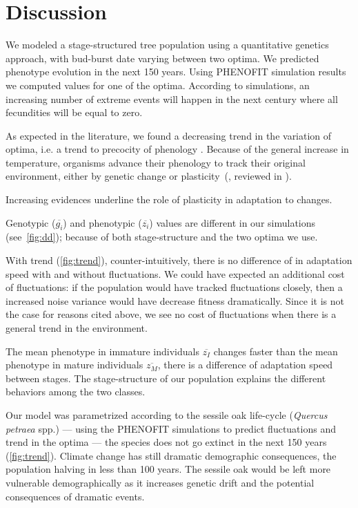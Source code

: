 \label{sec:Disc}
\section*{Discussion}

We modeled a stage-structured tree population using a quantitative genetics approach, with bud-burst date varying between two optima. We predicted phenotype evolution in the next 150 years. Using \textsc{PHENOFIT} simulation results we computed values for one of the optima. According to simulations, an increasing number of extreme events will happen in the next century where all fecundities will be equal to zero.

As expected in the literature, we found a decreasing trend in the variation of optima, i.e. a trend to precocity of phenology \citep{aitken_adaptation_2008, ehrlen_timing_2009}. Because of the general increase in temperature, organisms advance their phenology to track their original environment, either by genetic change or plasticity~(\citealt{savolainen_genetic_2004}, reviewed in \citealt{merila_climate_2014}).

Increasing evidences underline the role of plasticity in adaptation to changes.

Genotypic ($\overline{g_i}$) and phenotypic ($\overline{z_i}$) values are different in our simulations (see~\autoref{fig:dd}); because of both stage-structure and the two optima we use.


With trend (\autoref{fig:trend}), counter-intuitively, there is no difference of in adaptation speed with and without fluctuations. We could have expected an additional cost of fluctuations: if the population would have tracked fluctuations closely, then a increased noise variance would have decrease fitness dramatically. Since it is not the case for reasons cited above, we see no cost of fluctuations when there is a general trend in the environment.

The mean phenotype in immature individuals $\overline{z_I}$ changes faster than the mean phenotype in mature individuals $\overline{z_M}$, there is a difference of adaptation speed between stages. The stage-structure of our population explains the different behaviors among the two classes. 

Our model was parametrized according to the sessile oak life-cycle (\textit{Quercus petraea} spp.) — using the \textsc{PHENOFIT} simulations to predict fluctuations and trend in the optima — the species does not go extinct in the next 150 years (\autoref{fig:trend}). Climate change has still dramatic demographic consequences, the population halving in less than 100 years. The sessile oak would be left more vulnerable demographically as it increases genetic drift and the potential consequences of dramatic events.

